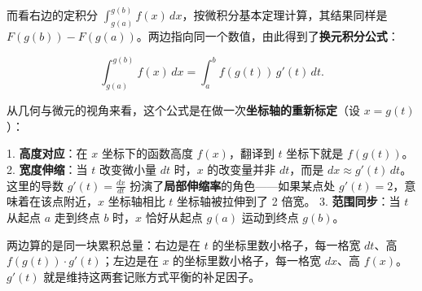 而看右边的定积分 \(\int_{g(a)}^{g(b)} f(x) \, dx\)，按微积分基本定理计算，其结果同样是 \(F(g(b)) - F(g(a))\)。两边指向同一个数值，由此得到了\textbf{换元积分公式}：


\[
\int_{g(a)}^{g(b)} f(x) \, dx = \int_a^b f(g(t)) \, g'(t) \, dt.
\]

从几何与微元的视角来看，这个公式是在做一次\textbf{坐标轴的重新标定}（设 \(x = g(t)\)）：

1. \textbf{高度对应}：在 \(x\) 坐标下的函数高度 \(f(x)\)，翻译到 \(t\) 坐标下就是 \(f(g(t))\)。
2. \textbf{宽度伸缩}：当 \(t\) 改变微小量 \(dt\) 时，\(x\) 的改变量并非 \(dt\)，而是 \(dx \approx g'(t) \, dt\)。这里的导数 \(g'(t) = \frac{dx}{dt}\) 扮演了\textbf{局部伸缩率}的角色——如果某点处 \(g'(t) = 2\)，意味着在该点附近，\(x\) 坐标轴相比 \(t\) 坐标轴被拉伸到了 2 倍宽。
3. \textbf{范围同步}：当 \(t\) 从起点 \(a\) 走到终点 \(b\) 时，\(x\) 恰好从起点 \(g(a)\) 运动到终点 \(g(b)\)。

两边算的是同一块累积总量：右边是在 \(t\) 的坐标里数小格子，每一格宽 \(dt\)、高 \(f(g(t)) \cdot g'(t)\)；左边是在 \(x\) 的坐标里数小格子，每一格宽 \(dx\)、高 \(f(x)\)。\(g'(t)\) 就是维持这两套记账方式平衡的补足因子。

